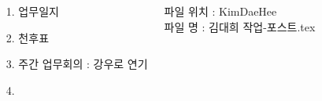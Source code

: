 \documentclass[25pt, a1paper ]{tikzposter}
\begin{document}
\begin{columns}
%





			{				
			\setlength{\leftmargini}{7em}			
			\setlength{\labelsep}{1em} %

			\begin{LARGE}
			\begin{itemize}
			\item [1.] 업무일지
			\item [2.] 천후표 
			\item [3.] 주간 업무회의 : 강우로 연기
			\item [4.] 

			\end{itemize}
			\end{LARGE}
파일 위치 :  KimDaeHee \\
파일 명 : 김대희 작업-포스트.tex


		}


%



\end{columns}
\end{document}
